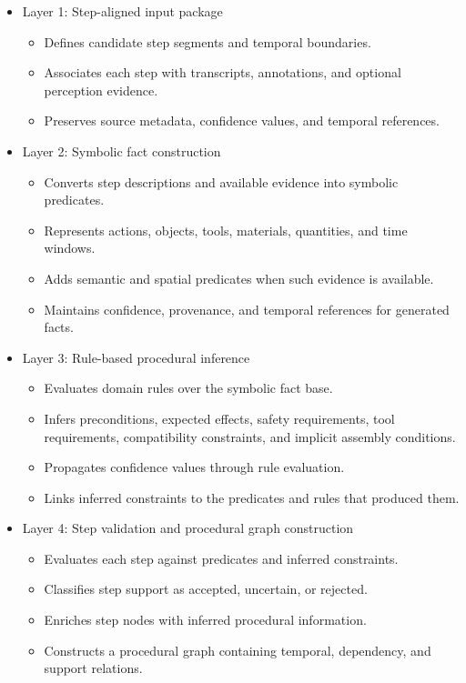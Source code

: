 \begin{itemize}
    \item Layer 1: Step-aligned input package
    \begin{itemize}
        \item Defines candidate step segments and temporal boundaries.
        \item Associates each step with transcripts, annotations, and optional perception evidence.
        \item Preserves source metadata, confidence values, and temporal references.
    \end{itemize}

    \item Layer 2: Symbolic fact construction
    \begin{itemize}
        \item Converts step descriptions and available evidence into symbolic predicates.
        \item Represents actions, objects, tools, materials, quantities, and time windows.
        \item Adds semantic and spatial predicates when such evidence is available.
        \item Maintains confidence, provenance, and temporal references for generated facts.
    \end{itemize}

    \item Layer 3: Rule-based procedural inference
    \begin{itemize}
        \item Evaluates domain rules over the symbolic fact base.
        \item Infers preconditions, expected effects, safety requirements, tool requirements, compatibility constraints, and implicit assembly conditions.
        \item Propagates confidence values through rule evaluation.
        \item Links inferred constraints to the predicates and rules that produced them.
    \end{itemize}

    \item Layer 4: Step validation and procedural graph construction
    \begin{itemize}
        \item Evaluates each step against predicates and inferred constraints.
        \item Classifies step support as accepted, uncertain, or rejected.
        \item Enriches step nodes with inferred procedural information.
        \item Constructs a procedural graph containing temporal, dependency, and support relations.
    \end{itemize}
\end{itemize}

